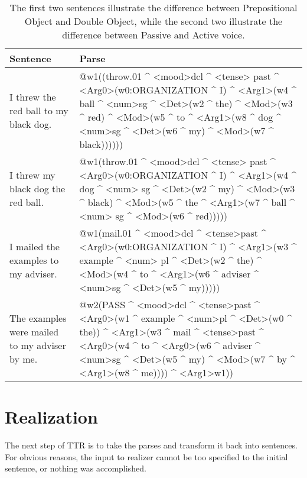 \documentclass[11pt]{article}
\newcommand{\tri}[1]{\textless #1\textgreater}
\begin{document}
\begin{table*}[t]
\begin{center}
\begin{tabular}{|p{2cm}|p{12.5cm}|}
\hline \bf Sentence & \bf Parse \\ \hline
I threw the red ball to my black dog. & @w1((throw.01 \^{} \tri{mood}dcl \^{} \tri{tense} past \^{} \tri{Arg0}(w0:ORGANIZATION \^{} I) \^{} \tri{Arg1}(w4 \^{} ball \^{} \tri{num}sg \^{} \tri{Det}(w2 \^{} the) \^{} \tri{Mod}(w3 \^{} red) \^{} \tri{Mod}(w5 \^{} to \^{} \tri{Arg1}(w8 \^{} dog \^{} \tri{num}sg \^{} \tri{Det}(w6 \^{} my) \^{} \tri{Mod}(w7 \^{} black)))))) \\ \hline
I threw my black dog the red ball. & @w1(throw.01 \^{} \tri{mood}dcl \^{} \tri{tense} past \^{} \tri{Arg0}(w0:ORGANIZATION \^{} I) \^{} \tri{Arg1}(w4 \^{} dog \^{} \tri{num} sg \^{} \tri{Det}(w2 \^{} my) \^{} \tri{Mod}(w3 \^{} black) \^{} \tri{Mod}(w5 \^{} the \^{} \tri{Arg1}(w7 \^{} ball \^{} \tri{num} sg \^{} \tri{Mod}(w6 \^{} red))))) \\ \hline
I mailed the examples to my adviser. & @w1(mail.01 \^{} \tri{mood}dcl \^{} \tri{tense}past \^{} \tri{Arg0}(w0:ORGANIZATION \^{} I) \^{} \tri{Arg1}(w3 \^{} example \^{} \tri{num} pl \^{} \tri{Det}(w2 \^{} the) \^{} \tri{Mod}(w4 \^{} to \^{} \tri{Arg1}(w6 \^{} adviser \^{} \tri{num}sg \^{} \tri{Det}(w5 \^{} my))))) \\ \hline
The examples were mailed to my adviser by me. & @w2(PASS \^{} \tri{mood}dcl \^{} \tri{tense}past \^{} \tri{Arg0}(w1 \^{} example \^{} \tri{num}pl \^{} \tri{Det}(w0 \^{} the)) \^{} \tri{Arg1}(w3 \^{} mail \^{} \tri{tense}past \^{} \tri{Arg0}(w4 \^{} to \^{} \tri{Arg0}(w6 \^{} adviser \^{} \tri{num}sg \^{} \tri{Det}(w5 \^{} my) \^{} \tri{Mod}(w7 \^{} by \^{} \tri{Arg1}(w8 \^{} me)))) \^{} \tri{Arg1}w1)) \\ \hline
\end{tabular}
\end{center}
\caption{\label{font-table} The first two sentences illustrate the difference between Prepositional Object and Double Object, while the second two illustrate the difference between Passive and Active voice. }
\end{table*}
\section{Realization}
The next step of TTR is to take the parses and transform it back into sentences. For obvious reasons, the input to realizer cannot be too specified to the initial sentence, or nothing was accomplished. 
\end{document}
